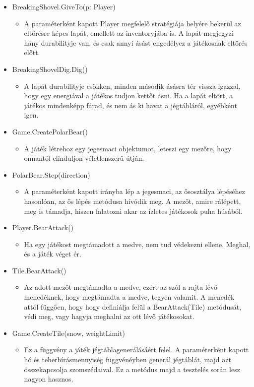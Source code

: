 \begin{itemize}
\item BreakingShovel.GiveTo(p: Player)
\begin{itemize} \item A paraméterként kapott Player megfelelő stratégiája helyére bekerül az eltörésre képes lapát, emellett az inventoryjába is. A lapát megjegyzi hány durabilityje van, és csak annyi ásást engedélyez a játékosnak eltörés előtt. \end{itemize}

\item BreakingShovelDig.Dig()
\begin{itemize} \item A lapát durabilityje csökken, minden második ásásra tér vissza igazzal, hogy egy energiával a játékos tudjon kettőt ásni. Ha a lapát eltört, a játékos mindenképp fárad, és nem ás ki havat a jégtábláról, egyébként igen. \end{itemize}

\item Game.CreatePolarBear()
\begin{itemize} \item A játék létrehoz egy jegesmaci objektumot, leteszi egy mezőre, hogy onnantól elinduljon véletlenszerű útján. \end{itemize}

\item PolarBear.Step(direction)
\begin{itemize} \item A paraméterként kapott irányba lép a jegesmaci, az ősosztálya lépéséhez hasonlóan, az ős lépés metódusa hívódik meg. A mezőt, amire rálépett, meg is támadja, hiszen falatozni akar az ízletes játékosok puha húsából. \end{itemize}

\item Player.BearAttack()
\begin{itemize} \item Ha egy játékost megtámadott a medve, nem tud védekezni ellene. Meghal, és a játék véget ér. \end{itemize}

\item Tile.BearAttack()
\begin{itemize} \item Az adott mezőt megtámadta a medve, ezért az szól a rajta lévő menedéknek, hogy megtámadta a medve, tegyen valamit. A menedék attól függően, hogy hogy definiálja felül a BearAttack(Tile) metódusát, védi meg, vagy hagyja meghalni az ott lévő játékosokat. \end{itemize}

\item Game.CreateTile(snow, weightLimit)
\begin{itemize} \item Ez a függvény a játék jégtáblagenerálásáért felel. A paraméterként kapott hó és teherbírásmennyiség függvénéyben generál jégtáblát, majd azt összekapcsolja szomszédaival. Ez a metódus majd a tesztelés során lesz nagyon hasznos. \end{itemize}

\end{itemize}


